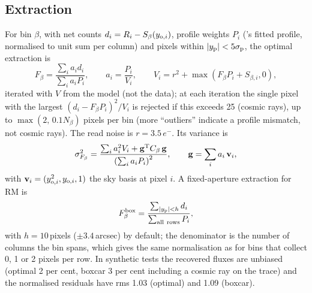 \subsection{Extraction}
\label{sec:extraction}
For bin $\beta$, with net counts $d_i=R_i-S_\beta(y_{{\rm o},i})$, profile weights $P_i$ (\banzai's fitted profile,
normalised to unit sum per column) and pixels within $|y_{\rm p}|<5\sigma_{\rm p}$, the optimal extraction
\citep{Horne1986} is
\begin{equation}
F_\beta=\frac{\sum_i a_i d_i}{\sum_i a_i P_i},\qquad a_i=\frac{P_i}{V_i},\qquad
V_i = r^2+\max(F_\beta P_i+S_{\beta,i},0),
\label{eq:horne}
\end{equation}
iterated with $V$ from the model (not the data); at each iteration the single pixel with the largest
$(d_i-F_\beta P_i)^2/V_i$ is rejected if this exceeds 25 (cosmic rays), up to $\max(2,\,0.1N_\beta)$ pixels per bin
(more ``outliers'' indicate a profile mismatch, not cosmic rays). The read noise is $r=3.5\,e^-$. Its variance is
\begin{equation}
\sigma^2_{F_\beta}=\frac{\sum_i a_i^2V_i+\mathbf{g}^{\rm T}C_\beta\,\mathbf{g}}{\left(\sum_i a_iP_i\right)^2},\qquad
\mathbf{g}=\sum_i a_i\,\mathbf{v}_i,
\label{eq:hornevar}
\end{equation}
with $\mathbf{v}_i=(y_{{\rm o},i}^2,y_{{\rm o},i},1)$ the sky basis at pixel $i$. A fixed-aperture extraction for RM is
\begin{equation}
F^{\rm box}_\beta=\frac{\sum_{|y_{\rm p}|<h}d_i}{\sum_{\rm all\ rows}P_i},
\label{eq:boxcar}
\end{equation}
with $h=10$\,pixels ($\pm3.4$\,arcsec) by default; the denominator is the number of columns the bin spans, which
gives the same normalisation as \banzai{} for bins that collect 0, 1 or 2 pixels per row. In synthetic tests the
recovered fluxes are unbiased (optimal 2 per cent, boxcar 3 per cent including a cosmic ray on the trace) and the
normalised residuals have rms 1.03 (optimal) and 1.09 (boxcar).
